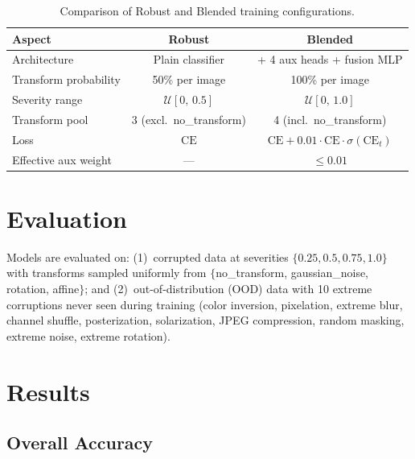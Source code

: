 \documentclass[11pt,a4paper]{article}
\begin{document}
\begin{table}[H]
\centering
\caption{Comparison of Robust and Blended training configurations.}
\label{tab:training_diff}
\begin{tabular}{lcc}
\toprule
\textbf{Aspect} & \textbf{Robust} & \textbf{Blended} \\
\midrule
Architecture & Plain classifier & + 4 aux heads + fusion MLP \\
Transform probability & 50\% per image & 100\% per image \\
Severity range & $\mathcal{U}[0,\, 0.5]$ & $\mathcal{U}[0,\, 1.0]$ \\
Transform pool & 3 (excl.\ no\_transform) & 4 (incl.\ no\_transform) \\
Loss & $\text{CE}$ & $\text{CE} + 0.01 \cdot \text{CE} \cdot \sigma(\text{CE}_t)$ \\
Effective aux weight & --- & $\leq 0.01$ \\
\bottomrule
\end{tabular}
\end{table}

\section{Evaluation}

Models are evaluated on: (1)~corrupted data at severities $\{0.25, 0.5, 0.75, 1.0\}$ with transforms sampled uniformly from $\{$no\_transform, gaussian\_noise, rotation, affine$\}$; and (2)~out-of-distribution (OOD) data with 10 extreme corruptions never seen during training (color inversion, pixelation, extreme blur, channel shuffle, posterization, solarization, JPEG compression, random masking, extreme noise, extreme rotation).

\section{Results}

\subsection{Overall Accuracy}
\end{document}
